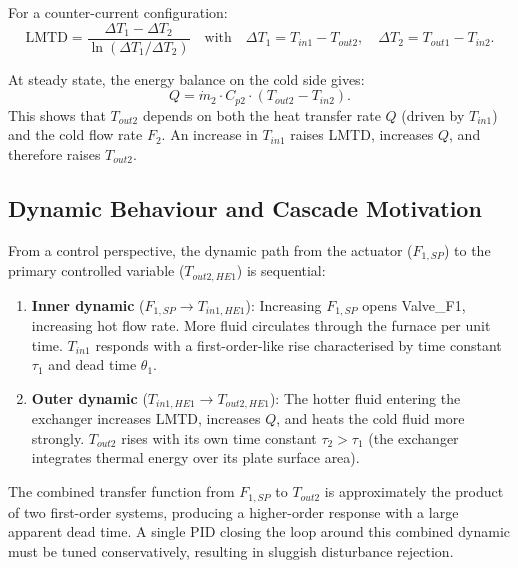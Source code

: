 For a counter-current configuration:
\begin{equation}
  \text{LMTD} = \frac{\Delta T_1 - \Delta T_2}{\ln(\Delta T_1 / \Delta T_2)}
  \quad \text{with} \quad
  \Delta T_1 = T_{in1} - T_{out2},\quad
  \Delta T_2 = T_{out1} - T_{in2}.
  \label{eq:lmtd}
\end{equation}

At steady state, the energy balance on the cold side gives:
\begin{equation}
  Q = \dot{m}_2 \cdot C_{p2} \cdot (T_{out2} - T_{in2}).
  \label{eq:cold_balance}
\end{equation}
This shows that $T_{out2}$ depends on both the heat transfer rate $Q$ (driven by $T_{in1}$)
and the cold flow rate $F_2$. An increase in $T_{in1}$ raises LMTD, increases $Q$, and
therefore raises $T_{out2}$.

\subsection{Dynamic Behaviour and Cascade Motivation}

From a control perspective, the dynamic path from the actuator ($F_{1,SP}$) to the primary
controlled variable ($T_{out2,HE1}$) is sequential:

\begin{enumerate}[leftmargin=*, itemsep=3pt]
  \item \textbf{Inner dynamic} ($F_{1,SP} \rightarrow T_{in1,HE1}$):
    Increasing $F_{1,SP}$ opens Valve\_F1, increasing hot flow rate. More fluid circulates
    through the furnace per unit time. $T_{in1}$ responds with a first-order-like rise
    characterised by time constant $\tau_1$ and dead time $\theta_1$.

  \item \textbf{Outer dynamic} ($T_{in1,HE1} \rightarrow T_{out2,HE1}$):
    The hotter fluid entering the exchanger increases LMTD, increases $Q$, and heats
    the cold fluid more strongly. $T_{out2}$ rises with its own time constant $\tau_2 > \tau_1$
    (the exchanger integrates thermal energy over its plate surface area).
\end{enumerate}

The combined transfer function from $F_{1,SP}$ to $T_{out2}$ is approximately the product
of two first-order systems, producing a higher-order response with a large apparent dead
time. A single PID closing the loop around this combined dynamic must be tuned
conservatively, resulting in sluggish disturbance rejection.

